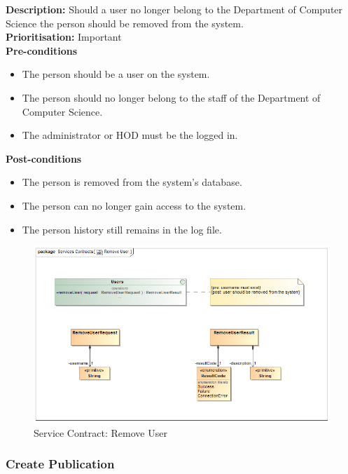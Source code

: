 \documentclass[a4paper]{article}
\begin{document}
    \textbf{Description:} Should a user no longer belong to the Department of Computer Science the person should be removed from the system.\\
    \textbf{Prioritisation:} Important\\
    
    \textbf{Pre-conditions}
     \begin{itemize}
        \item The person should be a user on the system.
        \item The person should no longer belong to the staff of the Department of Computer Science.
        \item The administrator or HOD must be the logged in.
   \end{itemize}
    
    \textbf{Post-conditions}
    \begin{itemize}
        \item The person is removed from the system's database.
        \item The person can no longer gain access to the system.
        \item The person history still remains in the log file.
    \end{itemize}

    	\begin{figure}[H]
    		\centering
    		\includegraphics[width=\textwidth]{5.1.4.Remove.User.Services.Contract.png}
    		\caption{Service Contract: Remove User}
    	\end{figure}
\pagebreak
    \subsubsection{Create Publication}
    
\end{document}
